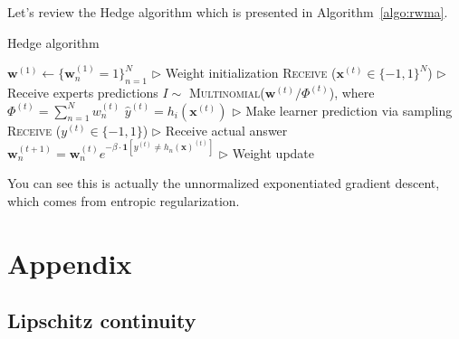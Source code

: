 \documentclass[11pt]{article}
\newcommand{\bw}{\boldsymbol{w}}
\begin{document}
Let's review the Hedge algorithm which is presented in Algorithm~\ref{algo:rwma}.
%
\begin{algorithm}[H]
\caption{Hedge algorithm}
\label{algo:rwma}
\begin{algorithmic}[1]
\STATE $\textbf{w}^{(1)} \leftarrow \{\bw_n^{(1)}=1\}_{n=1}^N$ \hfill $\triangleright$ Weight initialization
\STATE \textsc{Receive} ($\textbf{x}^{(t)}\in\{-1, 1\}^N$) \hfill $\triangleright$ Receive experts predictions
\STATE $I\sim$ \textsc{Multinomial}($\textbf{w}^{(t)}/\Phi^{(t)}$), where $\Phi^{(t)}=\sum_{n=1}^Nw_n^{(t)}$
\STATE $\hat{y}^{(t)}=h_i(\textbf{x}^{(t)})$ \hfill $\triangleright$ Make learner prediction via sampling
\STATE \textsc{Receive} ($y^{(t)}\in\{-1, 1\}$) \hfill $\triangleright$ Receive actual answer
\STATE $\bw_n^{(t+1)} =  \bw_n^{(t)}e^{-\beta\cdot\textbf{1}[y^{(t)}\neq h_n(\textbf{x})^{(t)}]}$ \hfill $\triangleright$ Weight update
\ENDFOR
\end{algorithmic}
\end{algorithm}
%
You can see this is actually the unnormalized exponentiated gradient descent, which comes from entropic regularization.



{


}

\section{Appendix}


\subsection{Lipschitz continuity}
\label{sec:l_smooth}
\end{document}
